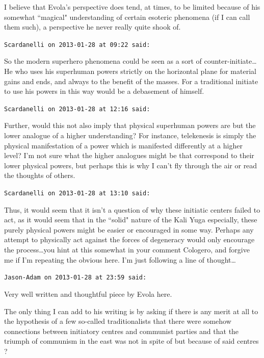 \begin{footnotesize}
\begin{sffamily}
I believe that Evola's perspective does tend, at times, to be limited because of his somewhat ``magical" understanding of certain esoteric phenomena (if I can call them such), a perspective he never really quite shook of.


\hfill

\texttt{Scardanelli on 2013-01-28 at 09:22 said: }

So the modern superhero phenomena could be seen as a sort of counter-initiate… He who uses his superhuman powers strictly on the horizontal plane for material gains and ends, and always to the benefit of the masses. For a traditional initiate to use his powers in this way would be a debasement of himself.


\hfill

\texttt{Scardanelli on 2013-01-28 at 12:16 said: }

Further, would this not also imply that physical superhuman powers are but the lower analogue of a higher understanding? For instance, telekenesis is simply the physical manifestation of a power which is manifested differently at a higher level? I'm not sure what the higher analogues might be that correspond to their lower physical powers, but perhaps this is why I can't fly through the air or read the thoughts of others.


\hfill

\texttt{Scardanelli on 2013-01-28 at 13:10 said: }

Thus, it would seem that it isn't a question of why these initiatic centers failed to act, as it would seem that in the ``solid" nature of the Kali Yuga especially, these purely physical powers might be easier or encouraged in some way. Perhaps any attempt to physically act against the forces of degeneracy would only encourage the process…you hint at this somewhat in your comment Cologero, and forgive me if I'm repeating the obvious here. I'm just following a line of thought…


\hfill

\texttt{Jason-Adam on 2013-01-28 at 23:59 said: }

Very well written and thoughtful piece by Evola here.

The only thing I can add to his writing is by asking if there is any merit at all to the hypothesis of a few so-called traditionalists that there were somehow connections between initiatory centres and communist parties and that the triumph of communism in the east was not in spite of but because of said centres ?



\end{sffamily}
\end{footnotesize}
